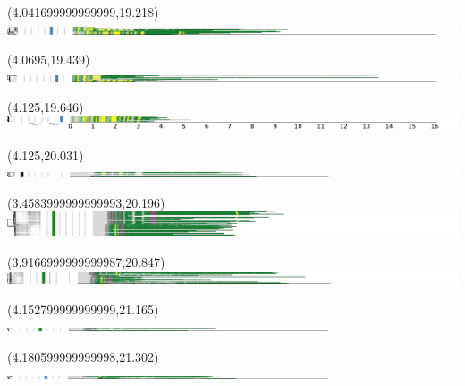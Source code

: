 \documentclass{article}
\begin{document}
\begin{textblock}{13}(4.041699999999999,19.218)\includegraphics{latex/figures/haplotypes-constrained/chr12-HG005.pdf}\end{textblock}
\begin{textblock}{13}(4.0695,19.439)\includegraphics{latex/figures/haplotypes-constrained/chr12-HG006.pdf}\end{textblock}
\begin{textblock}{13}(4.125,19.646)\includegraphics{latex/figures/haplotypes-constrained/chr12-HG007.pdf}\end{textblock}
\begin{textblock}{13}(4.125,20.031)\includegraphics{latex/figures/haplotypes-constrained/14qtel_1-500K_1_12_12_rc-HG001.pdf}\end{textblock}
\begin{textblock}{13}(3.4583999999999993,20.196)\includegraphics{latex/figures/haplotypes-constrained/14qtel_1-500K_1_12_12_rc-HG002.pdf}\end{textblock}
\begin{textblock}{13}(3.9166999999999987,20.847)\includegraphics{latex/figures/haplotypes-constrained/14qtel_1-500K_1_12_12_rc-HG003.pdf}\end{textblock}
\begin{textblock}{13}(4.152799999999999,21.165)\includegraphics{latex/figures/haplotypes-constrained/14qtel_1-500K_1_12_12_rc-HG004.pdf}\end{textblock}
\begin{textblock}{13}(4.180599999999998,21.302)\includegraphics{latex/figures/haplotypes-constrained/14qtel_1-500K_1_12_12_rc-HG005.pdf}\end{textblock}
\end{document}
